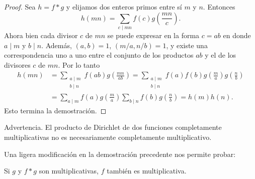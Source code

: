 \documentclass[12pt,a4paper]{book}
\begin{document}
    \begin{proof}
        Sea $h=f*g$ y elijamos dos enteros primos entre sí $m$ y $n$. Entonces
        \begin{equation*}
            h(mn)=\sum_{c\mid mn}f(c)g\left(\frac{mn}{c}\right).
        \end{equation*}
        Ahora bien cada divisor $c$ de $mn$ se puede expresar en la forma $c=ab$ en donde
        $a\mid m$ y $b\mid n$. Además, $(a,b)=1$, $(m/a,n/b)=1$, y existe una
        correspondencia uno a uno entre el conjunto de los productos $ab$ y el de los
        divisores $c$ de $mn$. Por lo tanto
        \begin{align*}
            h(mn)&=\sum_{\substack{a\mid m\\ b\mid n}}f(ab)g\left(\frac{mn}{ab}\right)
            =\sum_{\substack{a\mid m\\ b\mid n}}f(a)f(b)g\left(\frac{m}{a}\right)g\left(\frac{n}{b}\right)\\
            &=\sum_{a\mid m}f(a)g\left(\frac{m}{a}\right)\sum_{b\mid n}f(b)g\left(\frac{n}{b}\right)=h(m)h(n).
        \end{align*}
        Esto termina la demostración.
    \end{proof}

    Advertencia. El producto de Dirichlet de dos funciones completamente multiplicativas
    no es necesariamente completamente multiplicativo.

    Una ligera modificación en la demostración precedente nos permite probar:

    \begin{teorema}
        Si $g$ y $f*g$ son multiplicativas, $f$ también es multiplicativa.
    \end{teorema}
\end{document}
